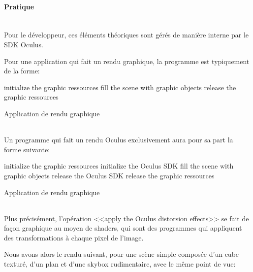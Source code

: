 \documentclass[a4paper,french,12pt]{article}
\begin{document}
			    \FloatBarrier
			\paragraph{Pratique} ~\\
			
			    Pour le développeur, ces éléments théoriques sont gérés de manière interne par le SDK Oculus.
			    
			    Pour une application qui fait un rendu graphique, la programme est typiquement de
			    la forme:\\
			    
			    \label{mainloop_normal}
			    \begin{algorithm}[H]
			      initialize the graphic ressources\;
			      fill the scene with graphic objects\;
			      release the graphic ressources\;
			      \caption{Application de rendu graphique}
			    \end{algorithm} ~\\
			    
			    Un programme qui fait un rendu Oculus exclusivement aura pour sa part la forme suivante:\\
			    \label{mainloop_oculus}
			    \begin{algorithm}[H]
			      initialize the graphic ressources\;
			      initialize the Oculus SDK\;
			      fill the scene with graphic objects\;
			      release the Oculus SDK\;
			      release the graphic ressources\;
			      \caption{Application de rendu graphique}
			    \end{algorithm} ~\\
			    Plus précisément, l'opération <<apply the Oculus distorsion effects>> se fait de façon graphique
			    au moyen de shaders, qui sont des programmes qui appliquent des transformations à chaque pixel de l'image.
			    

			    Nous avons alors le rendu suivant, pour une scène simple composée d'un cube texturé, d'un plan
			    et d'une skybox rudimentaire, avec le même point de vue:
			    
\end{document}
